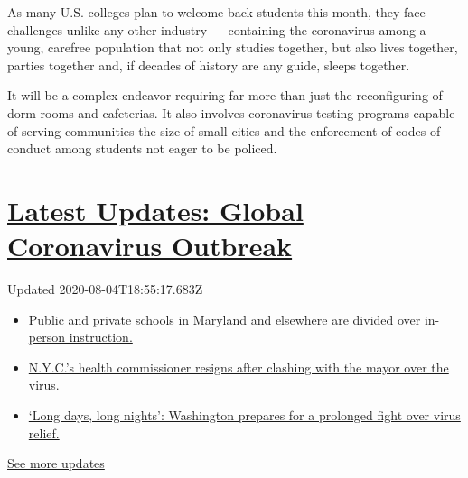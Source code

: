As many U.S. colleges plan to welcome back students this month, they
face challenges unlike any other industry --- containing the coronavirus
among a young, carefree population that not only studies together, but
also lives together, parties together and, if decades of history are any
guide, sleeps together.

It will be a complex endeavor requiring far more than just the
reconfiguring of dorm rooms and cafeterias. It also involves coronavirus
testing programs capable of serving communities the size of small cities
and the enforcement of codes of conduct among students not eager to be
policed.

\hypertarget{latest-updates-global-coronavirus-outbreak}{%
\section{\texorpdfstring{\href{https://www.nytimes.com/2020/08/04/world/coronavirus-cases.html?action=click\&pgtype=Article\&state=default\&region=MAIN_CONTENT_1\&context=storylines_live_updates}{Latest
Updates: Global Coronavirus
Outbreak}}{Latest Updates: Global Coronavirus Outbreak}}\label{latest-updates-global-coronavirus-outbreak}}

Updated 2020-08-04T18:55:17.683Z

\begin{itemize}
\tightlist
\item
  \href{https://www.nytimes.com/2020/08/04/world/coronavirus-cases.html?action=click\&pgtype=Article\&state=default\&region=MAIN_CONTENT_1\&context=storylines_live_updates\#link-4825b93}{Public
  and private schools in Maryland and elsewhere are divided over
  in-person instruction.}
\item
  \href{https://www.nytimes.com/2020/08/04/world/coronavirus-cases.html?action=click\&pgtype=Article\&state=default\&region=MAIN_CONTENT_1\&context=storylines_live_updates\#link-4d1eafa8}{N.Y.C.'s
  health commissioner resigns after clashing with the mayor over the
  virus.}
\item
  \href{https://www.nytimes.com/2020/08/04/world/coronavirus-cases.html?action=click\&pgtype=Article\&state=default\&region=MAIN_CONTENT_1\&context=storylines_live_updates\#link-6b644638}{`Long
  days, long nights': Washington prepares for a prolonged fight over
  virus relief.}
\end{itemize}

\href{https://www.nytimes.com/2020/08/04/world/coronavirus-cases.html?action=click\&pgtype=Article\&state=default\&region=MAIN_CONTENT_1\&context=storylines_live_updates}{See
more updates}

